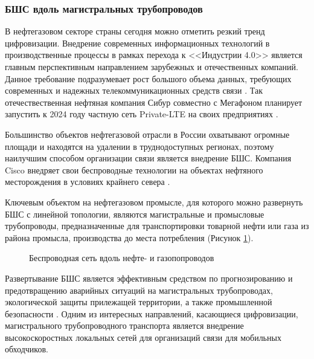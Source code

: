 \subsubsection{БШС вдоль магистральных трубопроводов}

В нефтегазовом секторе страны сегодня можно отметить резкий тренд цифровизации.  Внедрение современных информационных технологий в производственные процессы в рамках перехода к <<Индустрии 4.0>> является главным перспективным направлением зарубежных и отечественных компаний. Данное требование подразумевает рост большого объема данных, требующих современных и надежных телекоммуникационных средств связи \cite{sibur, cambiumnetworks_wireless, cisco_oil_gas, cisco_oil_gas, gegridsolutions_wireless, cisco_oil_gas}. Так отечествественная нефтяная компания Сибур совместно с Мегафоном планирует запустить к 2024 году частную сеть Private-LTE на своих предприятиях \cite{sibur}. 

Большинство объектов нефтегазовой отрасли в России охватывают огромные площади и находятся на удалении в труднодоступных регионах, поэтому наилучшим способом организации связи является внедрение БШС. Компания Cisco внедряет свои беспроводные технологии на объектах нефтяного месторождения в условиях крайнего севера \cite{cisco_oil_gas}.


Ключевым объектом на нефтегазовом промысле, для которого можно развернуть БШС с линейной топологии, являются магистральные и промысловые трубопроводы, предназначенные для транспортировки товарной нефти или газа из района промысла, производства до места потребления \cite{Deineko2018} (Рисунок \ref{fig:part2_pipeline}). 

\begin{figure}[ht]
  \caption{Беспроводная сеть вдоль нефте- и газопопроводов}\label{fig:part2_pipeline}
\end{figure}

Развертывание БШС является эффективным средством по прогнозированию и предотвращению аварийных ситуаций на магистральных трубопроводах, экологической защиты прилежащей территории, а также промышленной безопасности \cite{Krzyszton2021,Mehmood2016, Lin2019, Adegboye2019, Lin2019}. Одним из интересных направлений, касающиеся цифровизации, магистрального трубопроводного транспорта является внедрение высокоскоростных локальных сетей для организаций связи для мобильных обходчиков. 



